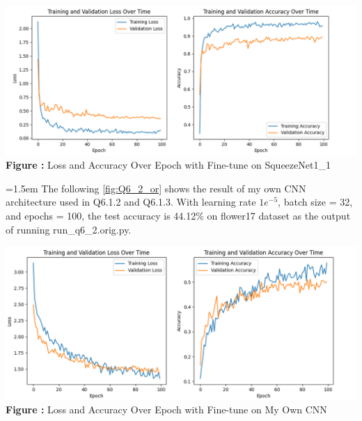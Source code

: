 \documentclass{article}
\begin{document}
\begin{minipage}{1\linewidth}
	\centering
	\hspace{0.12\linewidth} 
	\includegraphics[width=1\linewidth]{./Q6_2_ft.png}  %
	\newline
	\textbf{Figure \thefigure:} Loss and Accuracy Over Epoch with Fine-tune on SqueezeNet1\_1 %
	\label{fig:Q6_2_ft}  %
\end{minipage}
\newline	

	\hangindent=1.5em \hspace{1.5em}The following \autoref{fig:Q6_2_or} shows the result of my own CNN architecture used in Q6.1.2 and Q6.1.3. With learning rate $1e^{-5}$, batch size = 32, and epochs = 100, the test accuracy is 44.12\% on flower17 dataset as the output of running run\_q6\_2.orig.py.
\newline

\begin{minipage}{1\linewidth}
	\centering
	\hspace{0.12\linewidth} 
	\includegraphics[width=1\linewidth]{./Q6_2_or.png}  %
	\newline
	\textbf{Figure \thefigure:} Loss and Accuracy Over Epoch with Fine-tune on My Own CNN %
	\label{fig:Q6_2_or}  %
\end{minipage}
\newline
\end{document}
